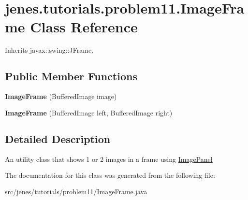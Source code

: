 \hypertarget{classjenes_1_1tutorials_1_1problem11_1_1_image_frame}{
\section{jenes.tutorials.problem11.ImageFrame Class Reference}
\label{classjenes_1_1tutorials_1_1problem11_1_1_image_frame}
}
Inherits javax::swing::JFrame.

\subsection*{Public Member Functions}
\begin{CompactItemize}
\item 
\hypertarget{classjenes_1_1tutorials_1_1problem11_1_1_image_frame_e07ab83a8781fd5748c34fd4c0ef4cfb}{
\textbf{ImageFrame} (BufferedImage image)}
\label{classjenes_1_1tutorials_1_1problem11_1_1_image_frame_e07ab83a8781fd5748c34fd4c0ef4cfb}

\item 
\hypertarget{classjenes_1_1tutorials_1_1problem11_1_1_image_frame_7cdded840043588eef66524cdab0af13}{
\textbf{ImageFrame} (BufferedImage left, BufferedImage right)}
\label{classjenes_1_1tutorials_1_1problem11_1_1_image_frame_7cdded840043588eef66524cdab0af13}

\end{CompactItemize}


\subsection{Detailed Description}
An utility class that shows 1 or 2 images in a frame using \hyperlink{classjenes_1_1tutorials_1_1problem11_1_1_image_panel}{ImagePanel} 

The documentation for this class was generated from the following file:\begin{CompactItemize}
\item 
src/jenes/tutorials/problem11/ImageFrame.java\end{CompactItemize}
